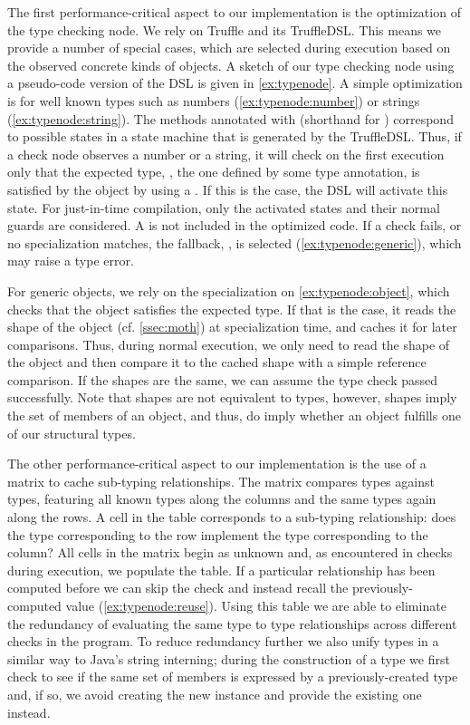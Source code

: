 The first performance-critical aspect to our implementation
is the optimization of the type checking node.
We rely on Truffle and its TruffleDSL\citep{humer2014domainspecific}.
This means we provide a number of special cases,
which are selected during execution based on the observed concrete 
kinds of objects.
A sketch of our type checking node using a pseudo-code version of the DSL
is given in \cref{ex:typenode}.
A simple optimization is for well known types such as
numbers (\cref{ex:typenode:number}) or strings (\cref{ex:typenode:string}).
The methods annotated with  (shorthand for )
correspond to possible states in a state machine that is generated by the
TruffleDSL.
Thus, if a check node observes a number or a string,
it will check on the first execution only that the expected type,
\ie, the one defined by some type annotation,
is satisfied by the object by using a .
If this is the case, the DSL will activate this state.
For just-in-time compilation, only the activated states and their normal guards are considered.
A  is not included in the optimized code.
If a check fails, or no specialization matches, the fallback,
\ie,  is selected (\cref{ex:typenode:generic}),
which may raise a type error.

For generic objects, we rely on the specialization on \cref{ex:typenode:object},
which checks that the object satisfies the expected type.
If that is the case, it reads the shape of the object (cf. \cref{ssec:moth}) at specialization time,
and caches it for later comparisons.
Thus, during normal execution,
we only need to read the shape of the object and then compare it to the cached shape
with a simple reference comparison.
If the shapes are the same, we can assume the type check passed successfully.
Note that shapes are not equivalent to types,
however, shapes imply the set of members of an object, and thus,
do imply whether an object fulfills one of our structural types.

The other performance-critical aspect to our implementation
is the use of a matrix to cache sub-typing relationships.
The matrix compares types against types,
featuring all known types along the columns and the same types again along the rows.
A cell in the table corresponds to a sub-typing relationship:
does the type corresponding to the row implement
the type corresponding to the column?
All cells in the matrix begin as unknown and, as
encountered in checks during execution, we populate the table.
If a particular relationship has been computed before
we can skip the check and instead recall the previously-computed value
(\cref{ex:typenode:reuse}).
Using this table we are able to eliminate the redundancy of evaluating
the same type to type relationships across different checks in the program. To reduce redundancy further we also unify types in a similar way to Java's string interning; 
during the construction of a type we first check to see if the same
set of members is expressed by a previously-created type and, if so,
we avoid creating the new instance and provide the existing one instead.


